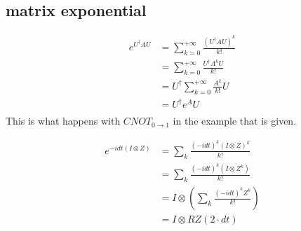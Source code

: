 \documentclass{article}
\begin{document}
\subsection{matrix exponential}

\begin{align*}
e^{U^{\dagger}AU} &= \sum_{k=0}^{+\infty} \frac{(U^{\dagger}AU)^{k}}{k!} \\ 
&= \sum_{k=0}^{+\infty} \frac{U^{\dagger}A^{k}U}{k!} \\ 
&= U^{\dagger}\sum_{k=0}^{+\infty} \frac{A^{k}}{k!}U \\ 
&= U^{\dagger}e^{A}U \\ 
\end{align*}
This is what happens with $CNOT_{0\rightarrow 1}$
in the example that is given.

\begin{align*}
    e^{-idt(I\otimes Z)} &= \sum_{k} \frac{(-idt)^k (I\otimes Z)^k }{k!} \\
    &= \sum_{k} \frac{(-idt)^k (I\otimes Z^k) }{k!} \\
    &= I \otimes \left(\sum_{k} \frac{(-idt)^k  Z^k }{k!} \right) \\
    &= I \otimes RZ(2\cdot dt)
\end{align*}




\end{document}

